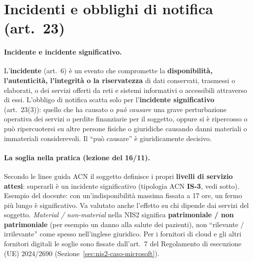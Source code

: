 \section{Incidenti e obblighi di notifica (art.~23)}
\label{sec:nis2-notifica}

\paragraph{Incidente e incidente significativo.} L'\textbf{incidente} (art.~6) è un evento che
compromette la \textbf{disponibilità, l'autenticità, l'integrità o la riservatezza} di dati conservati,
trasmessi o elaborati, o dei servizi offerti da reti e sistemi informativi o accessibili attraverso di
essi. L'obbligo di notifica scatta solo per l'\textbf{incidente significativo} (art.~23(3)): quello che
ha causato o \emph{può causare} una grave perturbazione operativa dei servizi o perdite finanziarie per
il soggetto, oppure si è ripercosso o può ripercuotersi su altre persone fisiche o giuridiche causando
danni materiali o immateriali considerevoli. Il ``può causare'' è giuridicamente decisivo.

\paragraph{La soglia nella pratica (lezione del 16/11).} Secondo le linee guida ACN il soggetto
definisce i propri \textbf{livelli di servizio attesi}: superarli è un incidente significativo
(tipologia ACN \textbf{IS-3}, vedi sotto). Esempio del docente: con un'indisponibilità massima fissata a 17 ore, un
fermo più lungo è significativo. Va valutato anche l'effetto su chi dipende dai servizi del soggetto.
\emph{Material / non-material} nella NIS2 significa \textbf{patrimoniale / non patrimoniale} (per
esempio un danno alla salute dei pazienti), non ``rilevante / irrilevante'' come spesso nell'inglese
giuridico. Per i fornitori di cloud e gli altri fornitori digitali le soglie sono fissate
dall'art.~7 del Regolamento di esecuzione (UE) 2024/2690 (Sezione~\ref{sec:nis2-caso-microsoft}).

